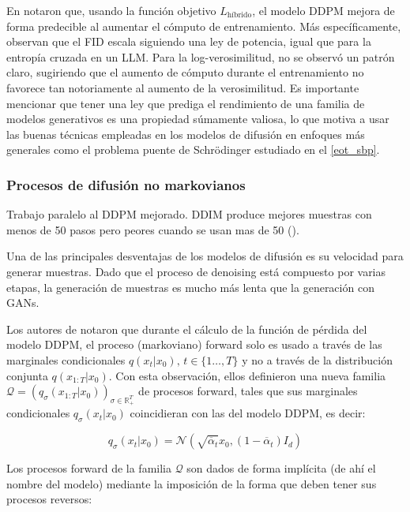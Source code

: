 En \cite{nichol2021improved} notaron que, usando la función objetivo $L_{\text{híbrido}}$, el modelo DDPM mejora de forma predecible al aumentar el cómputo de entrenamiento. Más específicamente, observan que el FID escala siguiendo una ley de potencia, igual que para la entropía cruzada en un LLM. Para la log-verosimilitud, no se observó un patrón claro, sugiriendo que el aumento de cómputo durante el entrenamiento no favorece tan notoriamente al aumento de la verosimilitud. Es importante mencionar que tener una ley que prediga el rendimiento de una familia de modelos generativos es una propiedad súmamente valiosa, lo que motiva a usar las buenas técnicas empleadas en los modelos de difusión en enfoques más generales como el problema puente de Schrödinger estudiado en el \autoref{eot_sbp}.

\subsubsection{Procesos de difusión no markovianos}

Trabajo paralelo al DDPM mejorado. DDIM produce mejores muestras con menos de 50 pasos pero peores cuando se usan mas de 50 (\cite{nichol2021improved}).

Una de las principales desventajas de los modelos de difusión es su velocidad para generar muestras. Dado que el proceso de denoising está compuesto por varias etapas, la generación de muestras es mucho más lenta que la generación con GANs.

Los autores de \cite{song2022denoising} notaron que durante el cálculo de la función de pérdida del modelo DDPM, el proceso (markoviano) forward solo es usado a través de las marginales condicionales $q(x_t|x_0),\,t\in\{1\ldots,T\}$ y no a través de la distribución conjunta $q(x_{1:T}|x_0)$. Con esta observación, ellos definieron una nueva familia $\mathcal{Q} = \left(q_\sigma(x_{1:T}|x_0)\right)_{\sigma\in\mathbb{R}_+^T}$ de procesos forward, tales que sus marginales condicionales $q_\sigma(x_t|x_0)$ coincidieran con las del modelo DDPM, es decir:

\begin{equation}
    q_\sigma(x_t|x_0) = \mathcal{N}\left(\sqrt{\overline{\alpha}_t}x_0,(1-\overline{\alpha}_t)I_d\right)
\end{equation}

Los procesos forward de la familia $\mathcal{Q}$ son dados de forma implícita (de ahí el nombre del modelo) mediante la imposición de la forma que deben tener sus procesos reversos:

